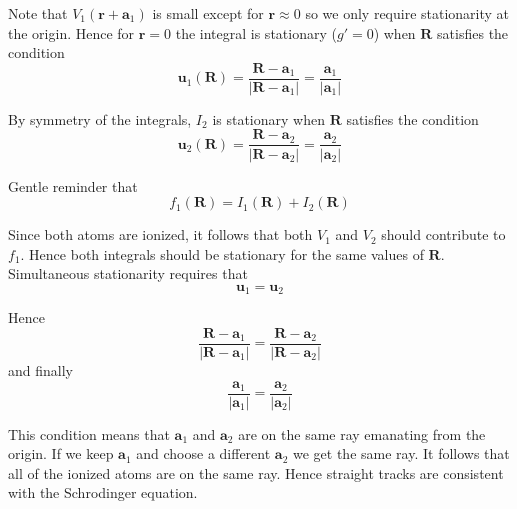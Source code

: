 \documentclass[12pt]{article}
\begin{document}
Note that $V_1(\mathbf r+\mathbf a_1)$ is small except for $\mathbf r\approx0$ so
we only require stationarity at the origin.
Hence for $\mathbf r=0$ the integral is stationary ($g'=0$)
when $\mathbf R$ satisfies the condition
\begin{equation*}
\mathbf u_1(\mathbf R)
=\frac{\mathbf R-\mathbf a_1}{|\mathbf R-\mathbf a_1|}
=\frac{\mathbf a_1}{|\mathbf a_1|}
\end{equation*}

By symmetry of the integrals, $I_2$ is stationary when $\mathbf R$ satisfies the condition
\begin{equation*}
\mathbf u_2(\mathbf R)
=\frac{\mathbf R-\mathbf a_2}{|\mathbf R-\mathbf a_2|}
=\frac{\mathbf a_2}{|\mathbf a_2|}
\end{equation*}

Gentle reminder that
\begin{equation*}
f_1(\mathbf R)=I_1(\mathbf R)+I_2(\mathbf R)
\end{equation*}

Since both atoms are ionized, it follows that both $V_1$ and $V_2$ should contribute to $f_1$.
Hence both integrals should be stationary for the same values of $\mathbf R$.
Simultaneous stationarity requires that
\begin{equation*}
\mathbf u_1=\mathbf u_2
\end{equation*}

Hence
\begin{equation*}
\frac{\mathbf R-\mathbf a_1}{|\mathbf R-\mathbf a_1|}=
\frac{\mathbf R-\mathbf a_2}{|\mathbf R-\mathbf a_2|}
\end{equation*}
and finally
\begin{equation*}
\frac{\mathbf a_1}{|\mathbf a_1|}=\frac{\mathbf a_2}{|\mathbf a_2|}
\end{equation*}

This condition means that $\mathbf a_1$ and $\mathbf a_2$
are on the same ray emanating from the origin.
If we keep $\mathbf a_1$ and choose a different $\mathbf a_2$ we get the same ray.
It follows that all of the ionized atoms are on the same ray.
Hence straight tracks are consistent with the Schrodinger equation.
\end{document}
